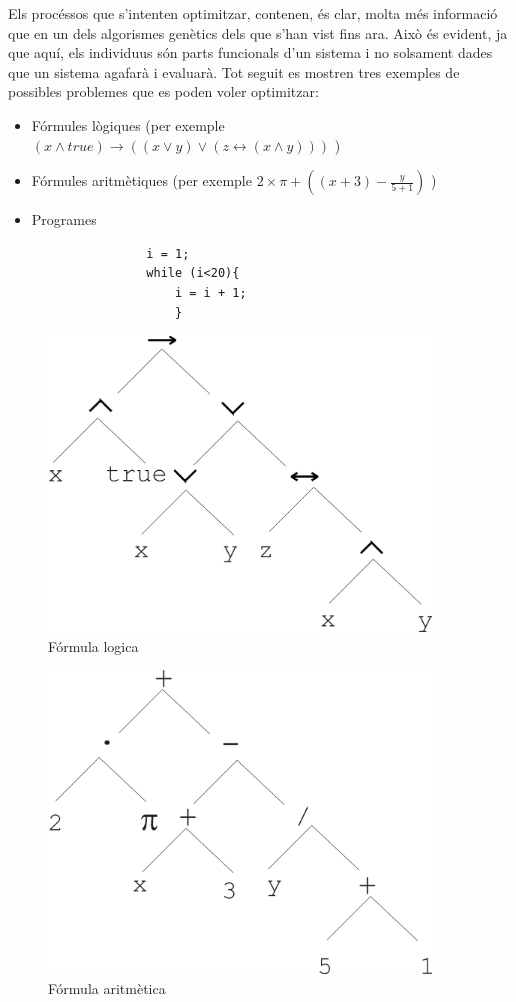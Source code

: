 \documentclass[titlepage,a4paper,12pt]{book}
\begin{document}
Els procéssos que s'intenten optimitzar, contenen, és clar, molta més informació
que en un dels algorismes genètics dels que s'han vist fins ara.  Això és
evident, ja que aquí, els individuus són parts funcionals d'un sistema i no
solsament dades que un sistema agafarà i evaluarà.  Tot seguit es mostren tres
exemples de possibles problemes que es poden voler optimitzar:

\begin{itemize}
	\item Fórmules lògiques (per exemple $ (x\land true) \rightarrow ((x \lor y)
	\lor (z \leftrightarrow ( x \land y)))$ )
	\item Fórmules aritmètiques (per exemple $2\times\pi+((x+3)-\frac{y}{5+1})$ )
	\item Programes 
		\begin{verbatim}
				i = 1;
				while (i<20){
					i = i + 1;
					}
		\end{verbatim}
\end{itemize}

\begin{figure} \centering \includegraphics[width=4in]{intro/6-2-2.jpg}
\caption{\label{fig:6-2-2}Fórmula logica}
\end{figure}

\begin{figure} \centering \includegraphics[width=4in]{intro/6-2-1.jpg}
\caption{\label{fig:6-2-1}Fórmula aritmètica}
\end{figure}
\end{document}
